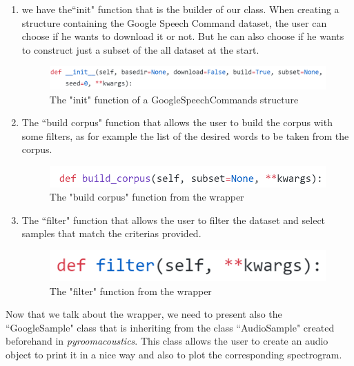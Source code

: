 \documentclass[11pt,a4paper,titlepage]{report}
\providecommand{\tightlist}{%
	\setlength{\itemsep}{0pt}\setlength{\parskip}{0pt}}
\begin{document}
\begin{enumerate}
	\tightlist
	\item  we have the``init" function that is the builder of our class. When creating a structure containing the Google Speech Command dataset, the user can choose if he wants to download it or not. But he can also choose if he wants to construct just a subset of the all dataset at the start.\\
	\begin{figure}[h!]
		\centering
		\includegraphics[width=0.95\linewidth]{Rapport5}
		\caption{The "init" function of a GoogleSpeechCommands structure}
		\label{fig:rapport5}
	\end{figure}
	\item The ``build corpus" function that allows the user to build the corpus with some filters, as for example the list of the desired words to be taken from the corpus.\\
	\begin{figure}[h!]
		\centering
		\includegraphics[width=0.7\linewidth]{Rapport6}
		\caption{The "build corpus" function from the wrapper}
		\label{fig:rapport6}
	\end{figure}
	\item The ``filter" function that allows the user to filter the dataset and select samples that match the criterias provided.\\
	\begin{figure}[h!]
		\centering
		\includegraphics[width=0.4\linewidth]{Rapport7}
		\caption{The "filter" function from the wrapper}
		\label{fig:rapport7}
	\end{figure}
\end{enumerate}
\hspace*{0.6cm}
Now that we talk about the wrapper, we need to present also the ``GoogleSample" class that is inheriting from the class ``AudioSample" created beforehand in \textit{pyroomacoustics}. This class allows the user to create an audio object to print it in a nice way and also to plot the corresponding spectrogram. 
\end{document}
